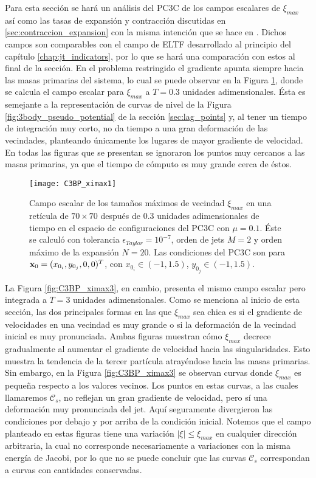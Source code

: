 Para esta sección se hará un análisis del PC3C de los campos escalares de $\xi_{max}$ así como las tasas de expansión y contracción discutidas en \ref{sec:contraccion_expansion} con la misma intención que se hace en \cite{Perez2015}. Dichos campos son comparables con el campo de ELTF desarrollado al principio del capítulo \ref{chap:jt_indicators}, por lo que se hará una comparación con estos al final de la sección. En el problema restringido el gradiente apunta siempre hacia las masas primarias del sistema, lo cual se puede observar en la Figura \ref{fig:C3BP_ximax1}, donde se calcula el campo escalar para $\xi_{max}$ a $T = 0.3$ unidades adimensionales. Ésta es semejante a la representación de curvas de nivel de la Figura \ref{fig:3body_pseudo_potential} de la sección \ref{sec:lag_points} y, al tener un tiempo de integración muy corto, no da tiempo a una gran deformación de las vecindades, planteando únicamente los lugares de mayor gradiente de velocidad. En todas las figuras que se presentan se ignoraron los puntos muy cercanos a las masas primarias, ya que el tiempo de cómputo es muy grande cerca de éstos. 

\begin{figure}
 \centering
 \texttt{[image: C3BP\_ximax1]}
 \caption{Campo escalar de los tamaños máximos de vecindad $\xi_{max}$ en una retícula de $70 \times 70$  después de $0.3$ unidades adimensionales de tiempo en el espacio de configuraciones del PC3C con $\mu = 0.1$. Éste se calculó con tolerancia $\epsilon_{Taylor} = 10^{-7}$, orden de jets $M = 2$ y orden máximo de la expansión $N = 20$. Las condiciones del PC3C son para $\mathbf{x}_0 = (x_{0_i}, y_{0_j}, 0, 0)^T$, con $x_{0_i} \in (-1, 1.5)$, $y_{0_j} \in (-1, 1.5)$.}
 \label{fig:C3BP_ximax1}
\end{figure}

La Figura \ref{fig:C3BP_ximax3}, en cambio, presenta el mismo campo escalar pero integrada a $T = 3$ unidades adimensionales. Como se menciona al inicio de esta sección, las dos principales formas en las que $\xi_{max}$ sea chica es si el gradiente de velocidades en una vecindad es muy grande o si la deformación de la vecindad inicial es muy pronunciada. Ambas figuras muestran cómo $\xi_{max}$ decrece gradualmente al aumentar el gradiente de velocidad hacia las singularidades. Esto muestra la tendencia de la tercer partícula atrayéndose hacia las masas primarias. Sin embargo, en la Figura \ref{fig:C3BP_ximax3} se observan curvas donde $\xi_{max}$ es pequeña  respecto a los valores vecinos. Los puntos en estas curvas, a las cuales llamaremos $\mathcal{C}_s$, no reflejan un gran gradiente de velocidad, pero sí una deformación muy pronunciada del jet. Aquí seguramente divergieron las condiciones por debajo y por arriba de la condición inicial. Notemos que el campo planteado en estas figuras tiene una variación $\lvert \xi \rvert \leq \xi_{max}$ en cualquier dirección arbitraria, la cual no corresponde necesariamente a variaciones con la misma energía de Jacobi, por lo que no se puede concluir que las curvas $\mathcal{C}_s$ correspondan a curvas con cantidades conservadas.

